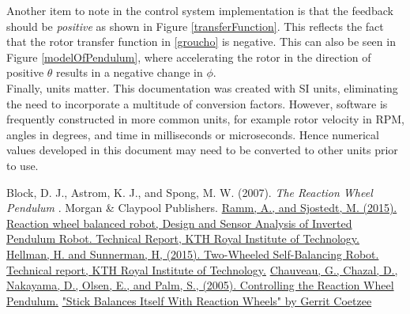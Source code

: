 \documentclass[12pt,letterpaper]{article}
\begin{document}
Another item to note in the control system implementation is that the feedback should be \textit{positive} as shown in Figure \ref{transferFunction}.  This reflects the fact that the rotor transfer function in \eqref{groucho} is negative.  This can also be seen in Figure \ref{modelOfPendulum}, where accelerating the rotor in the direction of positive $\theta$ results in a negative change in $\phi$.\\

Finally, units matter.  This documentation was created with SI units, eliminating the need to incorporate a multitude of conversion factors.  However, software is frequently constructed in more common units, for example rotor velocity in RPM, angles in degrees, and time in milliseconds or microseconds.  Hence numerical values developed in this document may need to
be converted to other units prior to use.







 
\begin{thebibliography}{99}
 Block, D. J., Astrom, K. J., and Spong, M. W. (2007).  \emph{The Reaction Wheel Pendulum} . Morgan \& Claypool Publishers.
 \href{http://www.diva-portal.se/smash/get/diva2:916271/FULLTEXT01.pdf}{Ramm, A., and Sjostedt, M. (2015). Reaction wheel balanced robot, Design and Sensor Analysis of Inverted Pendulum Robot. Technical Report, KTH Royal Institute of Technology.}
 \href{https://kth.diva-portal.org/smash/get/diva2:916184/FULLTEXT01.pdf}{Hellman, H. and Sunnerman, H, (2015).  Two-Wheeled Self-Balancing Robot. Technical report, KTH Royal Institute of Technology.}
 \href{http://geoffrey.chauveau.free.fr/pendulum/reports/final_report.pdf}{Chauveau, G., Chazal, D., Nakayama, D., Olsen, E., and Palm, S., (2005).  Controlling the Reaction Wheel Pendulum.}
 \href{https://hackaday.com/2016/08/11/stick-balances-itself-with-reaction-wheels/}{"Stick Balances Itself With Reaction Wheels" by Gerrit Coetzee}
\end{thebibliography}
\end{document}
